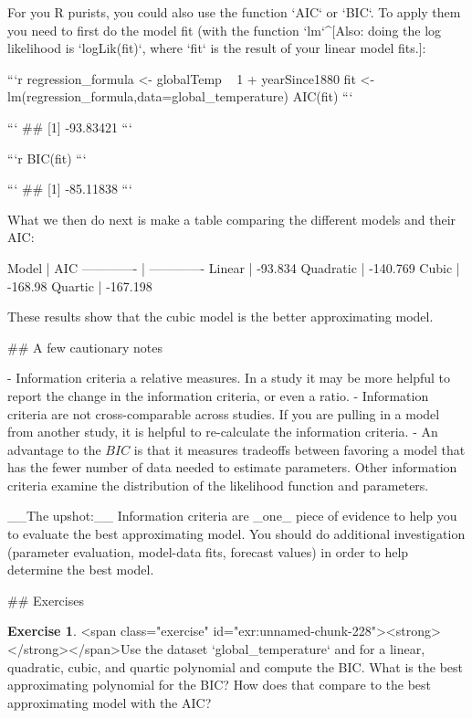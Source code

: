 \documentclass[
]{book}
\theoremstyle{definition}
\theoremstyle{definition}
\theoremstyle{definition}
\newtheorem{exercise}{Exercise}[chapter]
\theoremstyle{remark}
\begin{document}
For you R purists, you could also use the function `AIC` or `BIC`.  To apply them you need to first do the model fit (with the function `lm`^[Also: doing the log likelihood is `logLik(fit)`, where `fit` is the result of your linear model fits.]:


```r
regression_formula <- globalTemp ~ 1 + yearSince1880 
fit <- lm(regression_formula,data=global_temperature)
AIC(fit)
```

```
## [1] -93.83421
```

```r
BIC(fit)
```

```
## [1] -85.11838
```


What we then do next is make a table comparing the different models and their AIC:

Model  | AIC
------------- | ------------- 
Linear    | -93.834 
Quadratic    | -140.769 
Cubic        | -168.98 
Quartic        | -167.198 

These results show that the cubic model is the better approximating model.


## A few cautionary notes

- Information criteria a relative measures.  In a study it may be more helpful to report the change in the information criteria, or even a ratio.
- Information criteria are not cross-comparable across studies.  If you are pulling in a model from another study, it is helpful to re-calculate the information criteria.
- An advantage to the $BIC$ is that it measures tradeoffs between favoring a model that has the fewer number of data needed to estimate parameters.  Other information criteria examine the distribution of the likelihood function and parameters.


__The upshot:__ Information criteria are _one_ piece of evidence to help you to evaluate the best approximating model.  You should do additional investigation (parameter evaluation, model-data fits, forecast values) in order to help determine the best model.

\newpage

## Exercises
\begin{exercise}
<span class="exercise" id="exr:unnamed-chunk-228"><strong>\label{exr:unnamed-chunk-228} </strong></span>Use the dataset `global_temperature` and for a linear, quadratic, cubic, and quartic polynomial and compute the BIC. What is the best approximating polynomial for the BIC?  How does that compare to the best approximating model with the AIC?
\end{exercise}
\end{document}
